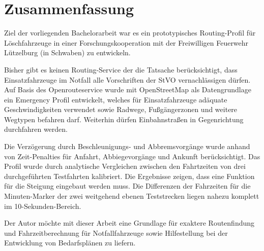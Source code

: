 {\centering\section*{Zusammenfassung}}

\vspace{1cm}

Ziel der vorliegenden Bachelorarbeit war es ein prototypisches Routing-Profil für Löschfahrzeuge in einer Forschungskooperation mit der Freiwilligen Feuerwehr Lützelburg (in Schwaben) zu entwickeln.
\medskip

Bisher gibt es keinen Routing-Service der die Tatsache berücksichtigt, dass Einsatzfahrzeuge im Notfall alle Vorschriften der StVO vernachlässigen dürfen.
Auf Basis des Openrouteservice wurde mit OpenStreetMap als Datengrundlage ein Emergency Profil entwickelt, welches für Einsatzfahrzeuge adäquate Geschwindigkeiten verwendet sowie Radwege, Fußgängerzonen und weitere Wegtypen befahren darf. Weiterhin dürfen Einbahnstraßen in Gegenrichtung durchfahren werden.\par
Die Verzögerung durch Beschleunigungs- und Abbremsvorgänge wurde anhand von Zeit-Penalties für Anfahrt, Abbiegevorgänge und Ankunft berücksichtigt.
Das Profil wurde durch analytische Vergleichen zwischen den Fahrtzeiten von drei durchgeführten Testfahrten kalibriert.
Die Ergebnisse zeigen, dass eine Funktion für die Steigung eingebaut werden muss.
Die Differenzen der Fahrzeiten für die Minuten-Marker der zwei weitgehend ebenen Teststrecken liegen nahezu komplett im 10-Sekunden-Bereich.
\bigskip

Der Autor möchte mit dieser Arbeit eine Grundlage für exaktere Routenfindung und Fahrzeitberechnung für Notfallfahrzeuge sowie Hilfestellung bei der Entwicklung von Bedarfsplänen zu liefern.
